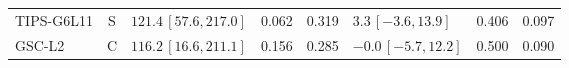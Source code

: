 \documentclass[10pt,a4paper]{article}
\begin{document}
\begin{longtable}{lcp{37mm}rrp{37mm}rr}
TIPS-G6L11 & S & \(121.4\,[57.6,217.0]\) & 0.062 & 0.319 & \(3.3\,[-3.6,13.9]\) & 0.406 & 0.097\\
GSC-L2 & C & \(116.2\,[16.6,211.1]\) & 0.156 & 0.285 & \(-0.0\,[-5.7,12.2]\) & 0.500 & 0.090\\

\end{longtable}
\end{document}
